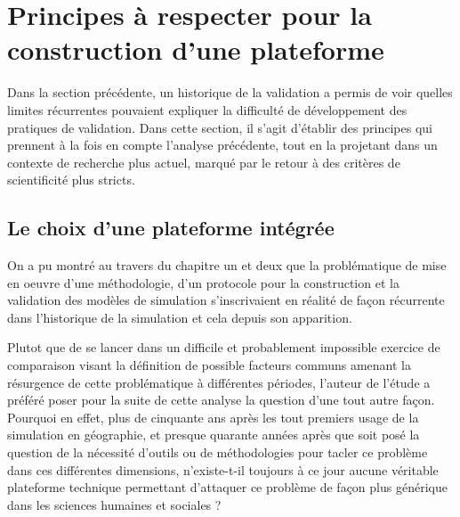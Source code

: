 
\section{Principes à respecter pour la construction d'une plateforme }
\label{sec:constante_problematique}



Dans la section précédente, un historique de la validation a permis de voir quelles limites récurrentes pouvaient expliquer la difficulté de développement des pratiques de validation. Dans cette section, il s'agit d'établir des principes qui prennent à la fois en compte l'analyse précédente, tout en la projetant dans un contexte de recherche plus actuel, marqué par le retour à des critères de scientificité plus stricts.

\subsection{Le choix d'une plateforme intégrée}
\label{ssec:choix_plateforme_integree}


On a pu montré au travers du chapitre un et deux que la problématique de mise  en oeuvre d'une méthodologie, d'un protocole pour la construction et la validation des modèles de simulation s'inscrivaient en réalité de façon récurrente dans l'historique de la simulation et cela depuis son apparition. 

Plutot que de se lancer dans un difficile et probablement impossible exercice de comparaison visant la définition de possible facteurs communs amenant la résurgence  de cette problématique à différentes périodes, l'auteur de l'étude a préféré poser pour la suite de cette analyse la question d'une tout autre façon. Pourquoi en effet, plus de cinquante ans après les tout premiers usage de la simulation en géographie, et presque quarante années après que soit posé la question de la nécessité d'outils ou de méthodologies pour tacler ce problème dans ces différentes dimensions, n'existe-t-il toujours à ce jour aucune véritable plateforme technique permettant d'attaquer ce problème de façon plus générique dans les sciences humaines et sociales ?

